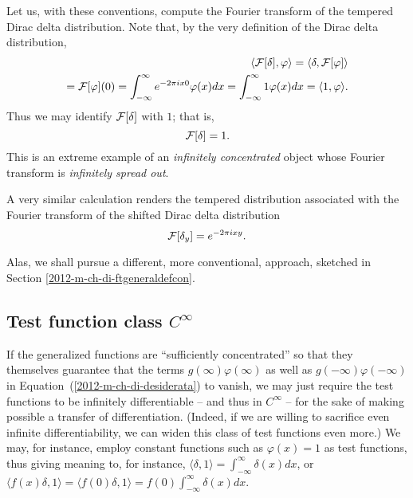 {
\color{blue}
\bexample
Let us, with these conventions, compute the Fourier transform of the tempered Dirac delta distribution.
Note that, by the very definition of the  Dirac delta distribution,
\begin{equation}
\begin{split}
\langle    {\cal F}[\delta  ] , \varphi \rangle
=
\langle   \delta , {\cal F}[\varphi ]\rangle
\\ =
{\cal F}[\varphi](0)=  \int_{-\infty}^\infty  e^{- 2\pi ix 0} \varphi (x) dx
=  \int_{-\infty}^\infty  1 \varphi (x) dx
=  \langle   1 , \varphi \rangle
.
\end{split}
\end{equation}
Thus we may identify  ${\cal F}[\delta  ]$ with $1$; that is,
\begin{equation}
{\cal F}[\delta  ] = 1
.
\end{equation}
This is an extreme example of an {\em infinitely concentrated} object whose Fourier transform is
{\em infinitely spread out}.

A very similar calculation renders the tempered distribution associated with the Fourier transform of the shifted Dirac delta distribution
\begin{equation}
{\cal F}[\delta_y  ] = e^{- 2\pi ix y}
.
\end{equation}
\eexample
}

Alas, we shall pursue a different, more conventional, approach, sketched in Section \ref{2012-m-ch-di-ftgeneraldefcon}.

\subsection{Test function class $C^\infty$}

If the generalized functions are ``sufficiently concentrated'' so that they themselves guarantee that the terms
$g(\infty)\varphi(\infty)$ as well as $g(-\infty)\varphi(-\infty)$
in Equation~(\ref{2012-m-ch-di-desiderata}) to vanish,
we may just require the test functions to be infinitely differentiable -- and thus in $C^\infty$ --
for the sake of making possible a transfer of differentiation.
(Indeed, if we are willing to sacrifice even infinite differentiability, we can widen this class of test functions even more.)
We may, for instance, employ constant functions such as $\varphi (x)=1$ as test functions,
thus giving meaning to, for instance,
$\langle \delta , 1\rangle= \int_{-\infty}^\infty \delta (x) dx$,
or
$\langle f(x)\delta , 1\rangle= \langle f(0)\delta , 1\rangle= f(0)\int_{-\infty}^\infty  \delta (x) dx$.

